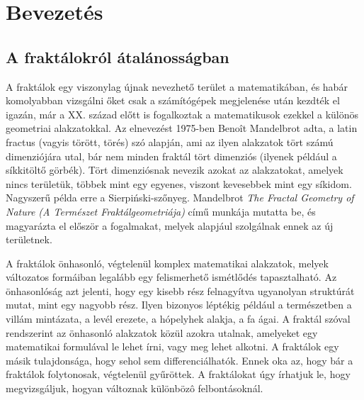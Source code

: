 \chapter*{Bevezetés}
\section*{A fraktálokról átalánosságban}
A fraktálok egy viszonylag újnak nevezhető terület a matematikában, és habár komolyabban vizsgálni őket csak a számítógépek megjelenése után kezdték el igazán, már a XX. század előtt is fogalkoztak a matematikusok ezekkel a különös geometriai alakzatokkal. Az elnevezést 1975-ben Benoît Mandelbrot adta, a latin fractus (vagyis törött, törés) szó alapján, ami az ilyen alakzatok tört számú dimenziójára utal, bár nem minden fraktál tört dimenziós (ilyenek például a síkkitöltő görbék). Tört dimenziósnak nevezik azokat az alakzatokat, amelyek nincs területük, többek mint egy egyenes, viszont kevesebbek mint egy síkidom. Nagyszerű példa erre a Sierpiński-szőnyeg. Mandelbrot {\it The Fractal Geometry of Nature (A Természet Fraktálgeometriája)} című munkája mutatta be, és magyarázta el először a fogalmakat, melyek alapjául szolgálnak ennek az új területnek. 
\par A fraktálok önhasonló, végtelenül komplex matematikai alakzatok, melyek változatos formáiban legalább egy felismerhető ismétlődés tapasztalható. Az önhasonlóság azt jelenti, hogy egy kisebb rész felnagyítva ugyanolyan struktúrát mutat, mint egy nagyobb rész. Ilyen bizonyos léptékig például a természetben a villám mintázata, a levél erezete, a hópelyhek alakja, a fa ágai. A fraktál szóval rendszerint az önhasonló alakzatok közül azokra utalnak, amelyeket egy matematikai formulával le lehet írni, vagy meg lehet alkotni. A fraktálok egy másik tulajdonsága, hogy sehol sem differenciálhatók. Ennek oka az, hogy bár a fraktálok folytonosak, végtelenül gyűröttek. A fraktálokat úgy írhatjuk le, hogy megvizsgáljuk, hogyan változnak különbözô felbontásoknál. 
